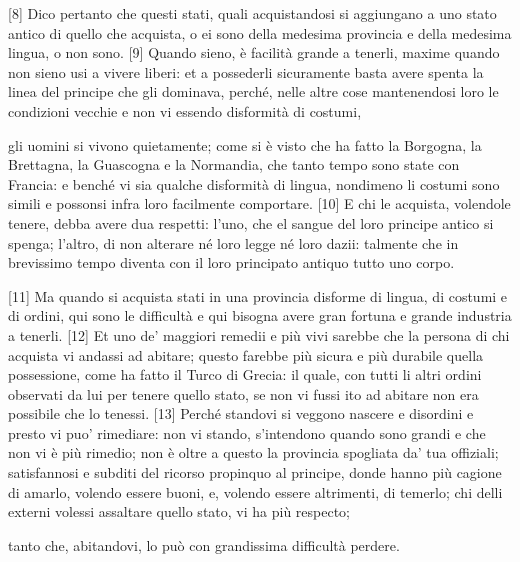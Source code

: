 {[}8{]} Dico pertanto che questi stati, quali acquistandosi si
aggiungano a uno stato antico di quello che acquista, o ei sono della
medesima provincia e della medesima lingua, o non sono. {[}9{]} Quando
sieno, è facilità grande a tenerli, maxime quando non sieno usi a vivere
liberi: et a possederli sicuramente basta avere spenta la linea del
principe che gli dominava, perché, nelle altre cose mantenendosi loro le
condizioni vecchie e non vi essendo disformità di costumi,

\quebra

\noindent{}gli uomini si
vivono quietamente; come si è visto che ha fatto la Borgogna, la
Brettagna, la Guascogna e la Normandia, che tanto tempo sono state con
Francia: e benché vi sia qualche disformità di lingua, nondimeno li
costumi sono simili e possonsi infra loro facilmente comportare.
{[}10{]} E chi le acquista, volendole tenere, debba avere dua respetti:
l'uno, che el sangue del loro principe antico si spenga; l'altro, di non
alterare né loro legge né loro dazii: talmente che in brevissimo tempo
diventa con il loro principato antiquo tutto uno corpo.

{[}11{]} Ma quando si acquista stati in una provincia disforme di
lingua, di costumi e di ordini, qui sono le difficultà e qui bisogna
avere gran fortuna e grande industria a tenerli. {[}12{]} Et uno de'
maggiori remedii e più vivi sarebbe che la persona di chi acquista vi
andassi ad abitare; questo farebbe più sicura e più durabile quella
possessione, come ha fatto il Turco di Grecia: il quale, con tutti li
altri ordini observati da lui per tenere quello stato, se non vi fussi
ito ad abitare non era possibile che lo tenessi. {[}13{]} Perché
standovi si veggono nascere e disordini e presto vi puo' rimediare: non
vi stando, s'intendono quando sono grandi e che non vi è più rimedio;
non è oltre a questo la provincia spogliata da' tua offiziali;
satisfannosi e subditi del ricorso propinquo al principe, donde hanno
più cagione di amarlo, volendo essere buoni, e, volendo essere
altrimenti, di temerlo; chi delli externi volessi assaltare quello
stato, vi ha più respecto; \linebreak

\quebra

\noindent{}tanto che, abitandovi, lo può con grandissima difficultà perdere.

